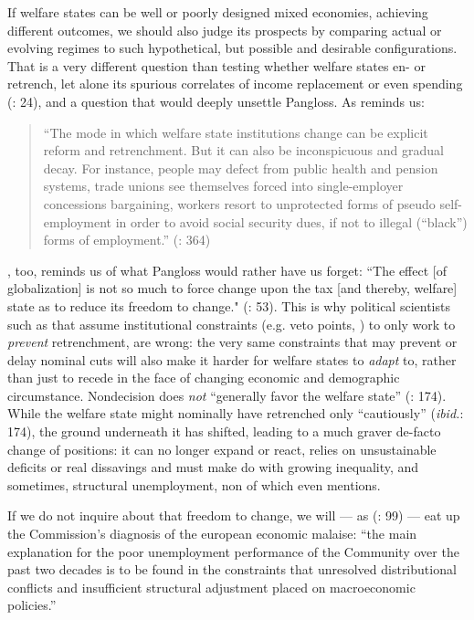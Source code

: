 \documentclass[11pt,a4paper,oneside,openright]{article}
\begin{document}
If welfare states can be well or poorly designed mixed economies, achieving different outcomes, we should also judge its prospects by comparing actual or evolving regimes to such hypothetical, but possible and desirable configurations. That is a very different question than testing whether welfare states en- or retrench, let alone its spurious correlates of income replacement \citep{Swank-2005-aa} or even spending (\citealt{Kleinman2002}: 24), and a question that would deeply unsettle Pangloss. As \citeauthor{Offe2003} reminds us:
	\begin{quote}
		``The mode in which welfare state institutions change can be explicit reform and retrenchment. But it can also be inconspicuous and gradual decay. For instance, people may defect from public health and pension systems, trade unions see themselves forced into single-employer concessions bargaining, workers resort to unprotected forms of pseudo self-employment in order to avoid social security dues, if not to illegal (“black”) forms of employment.'' (\citeyear{Offe2003}: 364)
	\end{quote}
\citeauthor{Genschel2005}, too, reminds us of what Pangloss would rather have us forget: ``The effect [of globalization] is not so much to force change upon the tax [and thereby, welfare] state as to reduce its freedom to change." (\citeyear{Genschel2005}: 53). This is  why political scientists such as \cite{Pierson2002,Pierson1996} that assume institutional constraints (e.g. veto points, \citealt{Tsebelis-2002-aa}) to only work to \emph{prevent} retrenchment, are wrong: the very same constraints that may prevent or delay nominal cuts will also make it harder for welfare states to \emph{adapt} to, rather than just to recede in the face of changing economic and demographic circumstance. Nondecision does \emph{not} ``generally favor the welfare state'' (\citealt{Pierson1996}: 174). While the welfare state might nominally have retrenched only ``cautiously'' (\emph{ibid.}: 174), the ground underneath it has shifted, leading to a much graver de-facto change of positions: it can no longer expand or react, relies on unsustainable deficits or real dissavings and must make do with growing inequality, and sometimes, structural unemployment, non of which \citeauthor{Pierson1996} even mentions.

If we do not inquire about that freedom to change, we will --- as \citeauthor{Kleinman2002} (\citeyear{Kleinman2002}: 99) --- eat up the Commission's diagnosis of the european economic malaise: ``the main explanation for the poor unemployment performance of the Community over the past two decades is to be found in the constraints that unresolved distributional conflicts and insufficient structural adjustment placed on macroeconomic policies.''
\end{document}
